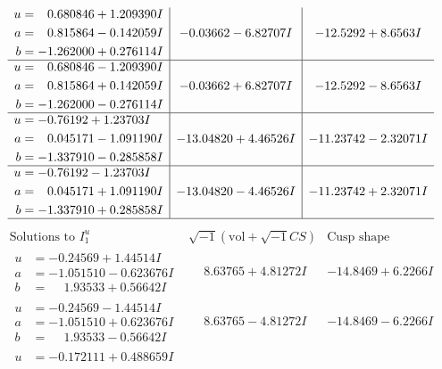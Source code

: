\documentclass[1p]{elsarticle_modified}
\theoremstyle{definition}
\newcommand{\I}{\sqrt{-1}}
\begin{document}
$$\begin{array}{c|c|c}
\begin{aligned}
u &= \phantom{-}0.680846 + 1.209390 I \\
a &= \phantom{-}0.815864 - 0.142059 I \\
b &= -1.262000 + 0.276114 I\end{aligned}
 & -0.03662 - 6.82707 I & -12.5292 + 8.6563 I \\ \hline\begin{aligned}
u &= \phantom{-}0.680846 - 1.209390 I \\
a &= \phantom{-}0.815864 + 0.142059 I \\
b &= -1.262000 - 0.276114 I\end{aligned}
 & -0.03662 + 6.82707 I & -12.5292 - 8.6563 I \\ \hline\begin{aligned}
u &= -0.76192 + 1.23703 I \\
a &= \phantom{-}0.045171 - 1.091190 I \\
b &= -1.337910 - 0.285858 I\end{aligned}
 & -13.04820 + 4.46526 I & -11.23742 - 2.32071 I \\ \hline\begin{aligned}
u &= -0.76192 - 1.23703 I \\
a &= \phantom{-}0.045171 + 1.091190 I \\
b &= -1.337910 + 0.285858 I\end{aligned}
 & -13.04820 - 4.46526 I & -11.23742 + 2.32071 I\\
 \hline 
 \end{array}$$\newpage$$\begin{array}{c|c|c}  
\text{Solutions to }I^u_{1}& \I (\text{vol} + \sqrt{-1}CS) & \text{Cusp shape}\\
 \hline 
\begin{aligned}
u &= -0.24569 + 1.44514 I \\
a &= -1.051510 - 0.623676 I \\
b &= \phantom{-}1.93533 + 0.56642 I\end{aligned}
 & \phantom{-}8.63765 + 4.81272 I & -14.8469 + 6.2266 I \\ \hline\begin{aligned}
u &= -0.24569 - 1.44514 I \\
a &= -1.051510 + 0.623676 I \\
b &= \phantom{-}1.93533 - 0.56642 I\end{aligned}
 & \phantom{-}8.63765 - 4.81272 I & -14.8469 - 6.2266 I \\ \hline\begin{aligned}
u &= -0.172111 + 0.488659 I \\

\end{aligned}
\end{array}$$
\end{document}

